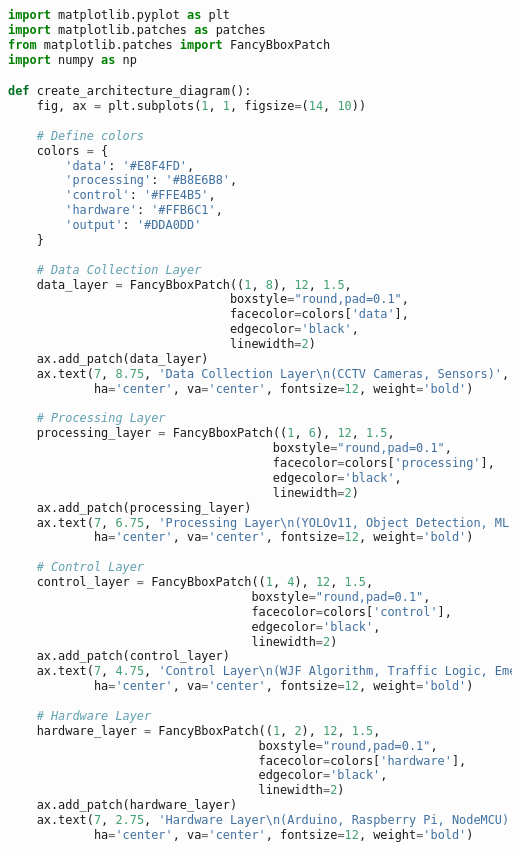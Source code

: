 \begin{lstlisting}[language=Python, caption=System Architecture Visualization]
import matplotlib.pyplot as plt
import matplotlib.patches as patches
from matplotlib.patches import FancyBboxPatch
import numpy as np

def create_architecture_diagram():
    fig, ax = plt.subplots(1, 1, figsize=(14, 10))
    
    # Define colors
    colors = {
        'data': '#E8F4FD',
        'processing': '#B8E6B8',
        'control': '#FFE4B5',
        'hardware': '#FFB6C1',
        'output': '#DDA0DD'
    }
    
    # Data Collection Layer
    data_layer = FancyBboxPatch((1, 8), 12, 1.5, 
                               boxstyle="round,pad=0.1",
                               facecolor=colors['data'],
                               edgecolor='black',
                               linewidth=2)
    ax.add_patch(data_layer)
    ax.text(7, 8.75, 'Data Collection Layer\n(CCTV Cameras, Sensors)', 
            ha='center', va='center', fontsize=12, weight='bold')
    
    # Processing Layer
    processing_layer = FancyBboxPatch((1, 6), 12, 1.5,
                                     boxstyle="round,pad=0.1",
                                     facecolor=colors['processing'],
                                     edgecolor='black',
                                     linewidth=2)
    ax.add_patch(processing_layer)
    ax.text(7, 6.75, 'Processing Layer\n(YOLOv11, Object Detection, ML Models)', 
            ha='center', va='center', fontsize=12, weight='bold')
    
    # Control Layer
    control_layer = FancyBboxPatch((1, 4), 12, 1.5,
                                  boxstyle="round,pad=0.1",
                                  facecolor=colors['control'],
                                  edgecolor='black',
                                  linewidth=2)
    ax.add_patch(control_layer)
    ax.text(7, 4.75, 'Control Layer\n(WJF Algorithm, Traffic Logic, Emergency Handling)', 
            ha='center', va='center', fontsize=12, weight='bold')
    
    # Hardware Layer
    hardware_layer = FancyBboxPatch((1, 2), 12, 1.5,
                                   boxstyle="round,pad=0.1",
                                   facecolor=colors['hardware'],
                                   edgecolor='black',
                                   linewidth=2)
    ax.add_patch(hardware_layer)
    ax.text(7, 2.75, 'Hardware Layer\n(Arduino, Raspberry Pi, NodeMCU)', 
            ha='center', va='center', fontsize=12, weight='bold')
    

\end{lstlisting}
